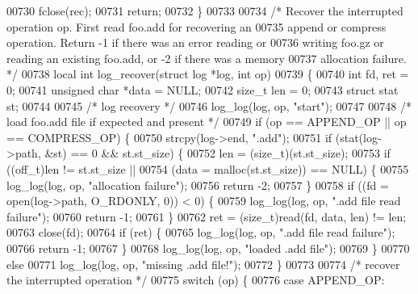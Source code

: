\begin{DoxyCode}
{00730     fclose(rec);
00731     \textcolor{keywordflow}{return};
00732 \}
00733 
00734 \textcolor{comment}{/* Recover the interrupted operation op.  First read foo.add for recovering an}
00735 \textcolor{comment}{   append or compress operation.  Return -1 if there was an error reading or}
00736 \textcolor{comment}{   writing foo.gz or reading an existing foo.add, or -2 if there was a memory}
00737 \textcolor{comment}{   allocation failure. */}
00738 local \textcolor{keywordtype}{int} log\_recover(\textcolor{keyword}{struct} log *log, \textcolor{keywordtype}{int} op)
00739 \{
00740     \textcolor{keywordtype}{int} fd, ret = 0;
00741     \textcolor{keywordtype}{unsigned} \textcolor{keywordtype}{char} *data = NULL;
00742     \textcolor{keywordtype}{size\_t} len = 0;
00743     \textcolor{keyword}{struct }stat st;
00744 
00745     \textcolor{comment}{/* log recovery */}
00746     log\_log(log, op, \textcolor{stringliteral}{"start"});
00747 
00748     \textcolor{comment}{/* load foo.add file if expected and present */}
00749     \textcolor{keywordflow}{if} (op == APPEND\_OP || op == COMPRESS\_OP) \{
00750         strcpy(log->end, \textcolor{stringliteral}{".add"});
00751         \textcolor{keywordflow}{if} (stat(log->path, &st) == 0 && st.st\_size) \{
00752             len = (size\_t)(st.st\_size);
00753             \textcolor{keywordflow}{if} ((off\_t)len != st.st\_size ||
00754                     (data = malloc(st.st\_size)) == NULL) \{
00755                 log\_log(log, op, \textcolor{stringliteral}{"allocation failure"});
00756                 \textcolor{keywordflow}{return} -2;
00757             \}
00758             \textcolor{keywordflow}{if} ((fd = open(log->path, O\_RDONLY, 0)) < 0) \{
00759                 log\_log(log, op, \textcolor{stringliteral}{".add file read failure"});
00760                 \textcolor{keywordflow}{return} -1;
00761             \}
00762             ret = (size\_t)read(fd, data, len) != len;
00763             close(fd);
00764             \textcolor{keywordflow}{if} (ret) \{
00765                 log\_log(log, op, \textcolor{stringliteral}{".add file read failure"});
00766                 \textcolor{keywordflow}{return} -1;
00767             \}
00768             log\_log(log, op, \textcolor{stringliteral}{"loaded .add file"});
00769         \}
00770         \textcolor{keywordflow}{else}
00771             log\_log(log, op, \textcolor{stringliteral}{"missing .add file!"});
00772     \}
00773 
00774     \textcolor{comment}{/* recover the interrupted operation */}
00775     \textcolor{keywordflow}{switch} (op) \{
00776     \textcolor{keywordflow}{case} APPEND\_OP:
}
\end{DoxyCode}
